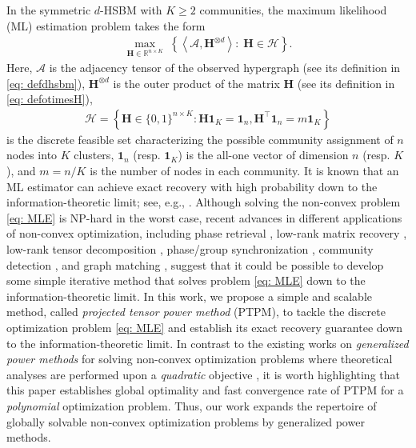 \documentclass{article}
\theoremstyle{plain}
\theoremstyle{definition}
\theoremstyle{remark}
\newcommand{\BH}{\bm{H}}
\newcommand{\HCal}{\mathcal{H}}
\newcommand{\ACal}{\mathcal{A}}
\def\b1{\bm{1}}
\begin{document}
In the symmetric $d$-HSBM with $K \geq 2$ communities, the maximum likelihood (ML) estimation problem takes the form
\begin{align} \label{eq: MLE}
	\max_{\BH \in \mathbb{R}^{n \times K}} \;  \left\{ \left \langle \ACal,  \bm{H}^{\otimes d} \right\rangle : \;  \bm{H} \in \HCal \right\}. \tag{MLE}
\end{align}
Here, $\ACal$ is the adjacency tensor of the observed hypergraph (see its definition in \eqref{eq: defdhsbm}), $\BH^{\otimes d}$ is the outer product of the matrix $\bm{H}$ (see its definition in \eqref{eq: defotimesH}),
\begin{align*}
	\HCal=\left\{ \bm{H} \in \{0,1\}^{n \times K}: \bm{H} \b1_{K}=\b1_{n}, \bm{H}^\top \b1_{n}=m \b1_{K}\right\}
\end{align*}
is the discrete feasible set characterizing the possible community assignment of $n$ nodes into $K$ clusters, $\b1_n$ (resp. $\b1_K$) is the all-one vector of dimension $n$ (resp. $K$), and $m=n/K$ is the number of nodes in each community.
 It is known that an ML estimator can achieve exact recovery with high probability down to the information-theoretic limit; see, e.g., \citet[Proposition 1; Theorem 1]{kim2018stochastic}. Although solving the non-convex problem \eqref{eq: MLE} is NP-hard in the worst case, recent advances in different applications of non-convex optimization, including phase retrieval \citep{candes2015phase,chen2019gradient}, low-rank matrix recovery \citep{chi2019nonconvex,li2020nonconvex}, low-rank tensor decomposition \citep{richard2014statistical,huang2022power,han2022exact}, phase/group synchronization \citep{liu2017estimation,zhong2018near,zhu2021orthogonal,ling2022improved}, community detection \citep{wang2021optimal,wang2021non,wang2020nearly,wang2022exact}, and graph matching \citep{araya2022seeded}, suggest that it could be possible to develop some simple iterative method that solves problem \eqref{eq: MLE} down to the information-theoretic limit. In this work, we propose a simple and scalable method, called \emph{projected tensor power method} (PTPM), to tackle the discrete optimization problem \eqref{eq: MLE} and establish its exact recovery guarantee down to the information-theoretic limit. In contrast to the existing works on \emph{generalized power methods} for solving non-convex optimization problems where theoretical analyses are performed upon a \emph{quadratic} objective \citep{liu2017estimation,zhong2018near,zhu2021orthogonal,ling2022improved,wang2021optimal,wang2021non,wang2022exact,araya2022seeded}, it is worth highlighting that this paper establishes global optimality and fast convergence rate of PTPM for a \emph{polynomial} optimization problem. Thus, our work expands the repertoire of globally solvable non-convex optimization problems by generalized power methods.
\end{document}
